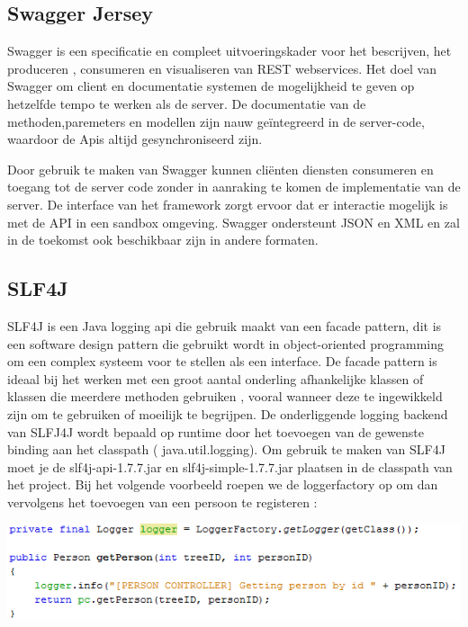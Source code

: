 \documentclass[pdftex,a4paper,12pt,twoside]{report}
\begin{document}
\subsection{Swagger Jersey}
Swagger is een specificatie en compleet uitvoeringskader voor het bescrijven, het produceren , consumeren en visualiseren van REST webservices. Het doel van Swagger om client en documentatie systemen de mogelijkheid te geven op hetzelfde tempo te werken als de server. De documentatie van de methoden,paremeters en modellen zijn nauw geïntegreerd in de server-code, waardoor de Apis altijd gesynchroniseerd zijn.

Door gebruik te maken van Swagger kunnen cliënten diensten consumeren en toegang tot de server code zonder in aanraking te komen de implementatie van de server.
De interface van het framework zorgt ervoor dat er interactie mogelijk is  met de API in een sandbox omgeving.
Swagger ondersteunt JSON en XML en zal in de toekomst ook beschikbaar zijn in andere formaten.

\subsection{SLF4J}
SLF4J is een Java logging api die gebruik maakt van een facade pattern, dit is een software design pattern die gebruikt wordt in object-oriented programming om een complex systeem voor te stellen als een interface.
De facade pattern is ideaal bij het werken met een groot aantal onderling afhankelijke klassen of klassen die meerdere methoden gebruiken , vooral wanneer deze te ingewikkeld zijn om te gebruiken of moeilijk te begrijpen.
De onderliggende logging backend van SLFJ4J wordt bepaald op runtime door het toevoegen van de gewenste binding aan het classpath ( java.util.logging).
Om gebruik te maken van SLF4J moet je de slf4j-api-1.7.7.jar en slf4j-simple-1.7.7.jar plaatsen in de classpath van het project.
Bij het volgende voorbeeld roepen we de loggerfactory op om dan vervolgens het toevoegen van een persoon te registeren :


\includegraphics{images/logger.png}\\
\end{document}
